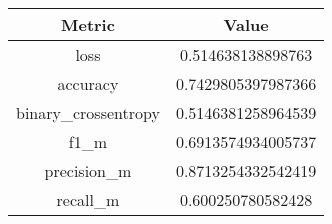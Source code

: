 \begin{table}[]
\begin{tabular}{|c|c|}
\hline
\textbf{Metric} & \textbf{Value} \\\hline
loss & 0.514638138898763 \\ \hline
 accuracy & 0.7429805397987366 \\ \hline
 binary\_crossentropy & 0.5146381258964539 \\ \hline
 f1\_m & 0.6913574934005737 \\ \hline
 precision\_m & 0.8713254332542419 \\ \hline
 recall\_m & 0.600250780582428 \\ \hline
\end{tabular}
\end{table}
